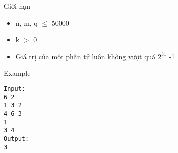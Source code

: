 Giới hạn  
\begin{itemize}
	\item     n, m, q  $\le$  50000   
	\item     k $>$ 0   
	\item     Giá trị của một phần tử luôn không vượt quá $2^{31}$    -1   
\end{itemize}
   Example  
\begin{verbatim}
Input:
6 2
1 3 2
4 6 3
1
3 4
Output:
3
\end{verbatim}